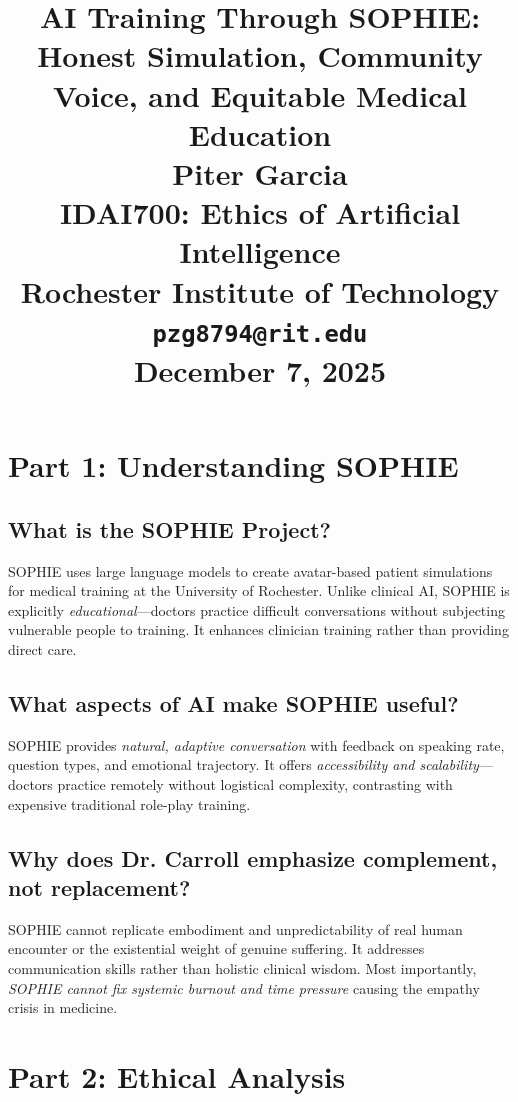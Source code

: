 \documentclass[12pt,twoside]{article}
\title{
\vspace*{1.5in}
\textbf{\Huge AI Training Through SOPHIE:}\\[0.5em]
\textbf{\Huge Honest Simulation, Community Voice, and Equitable Medical Education}\\[1.5em]

\vfill
\Huge \textbf{Piter Garcia}\\
\LARGE IDAI700: Ethics of Artificial Intelligence\\
Rochester Institute of Technology\\
\texttt{pzg8794@rit.edu}\\

\vfill
\Huge \textbf{December 7, 2025}
}
\author{}
\date{}
\begin{document}
\thispagestyle{empty}
\maketitle
\newpage

\pagestyle{fancy}

\section*{Part 1: Understanding SOPHIE}

\subsection*{What is the SOPHIE Project?}

SOPHIE uses large language models to create avatar-based patient simulations for medical training at the University of Rochester. Unlike clinical AI, SOPHIE is explicitly \emph{educational}—doctors practice difficult conversations without subjecting vulnerable people to training. It enhances clinician training rather than providing direct care.

\subsection*{What aspects of AI make SOPHIE useful?}

SOPHIE provides \emph{natural, adaptive conversation} with feedback on speaking rate, question types, and emotional trajectory. It offers \emph{accessibility and scalability}—doctors practice remotely without logistical complexity, contrasting with expensive traditional role-play training.

\subsection*{Why does Dr. Carroll emphasize complement, not replacement?}

SOPHIE cannot replicate embodiment and unpredictability of real human encounter or the existential weight of genuine suffering. It addresses communication skills rather than holistic clinical wisdom. Most importantly, \emph{SOPHIE cannot fix systemic burnout and time pressure} causing the empathy crisis in medicine.

\section*{Part 2: Ethical Analysis}
\end{document}

